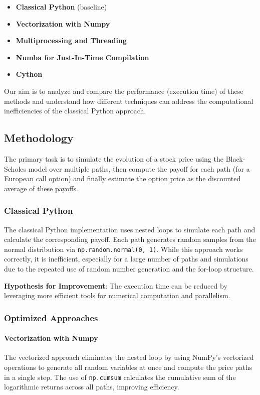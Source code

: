\documentclass[12pt,a4paper]{report}
\begin{document}
\begin{itemize}
    \item \textbf{Classical Python} (baseline)
    \item \textbf{Vectorization with Numpy}
    \item \textbf{Multiprocessing and Threading}
    \item \textbf{Numba for Just-In-Time Compilation}
    \item \textbf{Cython}
\end{itemize}

Our aim is to analyze and compare the performance (execution time) of these methods and understand how different techniques can address the computational inefficiencies of the classical Python approach.

\subsection{Methodology}

The primary task is to simulate the evolution of a stock price using the Black-Scholes model over multiple paths, then compute the payoff for each path (for a European call option) and finally estimate the option price as the discounted average of these payoffs.

\subsubsection{Classical Python}

The classical Python implementation uses nested loops to simulate each path and calculate the corresponding payoff. Each path generates random samples from the normal distribution via \texttt{np.random.normal(0, 1)}. While this approach works correctly, it is inefficient, especially for a large number of paths and simulations due to the repeated use of random number generation and the for-loop structure.

\textbf{Hypothesis for Improvement}: The execution time can be reduced by leveraging more efficient tools for numerical computation and parallelism.

\subsubsection{Optimized Approaches}

\paragraph{Vectorization with Numpy}  
The vectorized approach eliminates the nested loop by using NumPy's vectorized operations to generate all random variables at once and compute the price paths in a single step. The use of \texttt{np.cumsum} calculates the cumulative sum of the logarithmic returns across all paths, improving efficiency.
\end{document}
